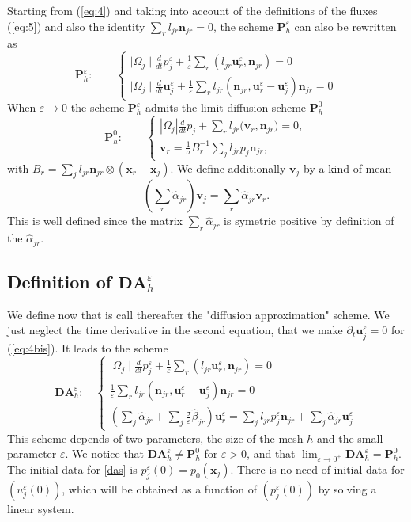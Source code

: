 \documentclass[a4paper,french,english,10pt]{article}
\newcommand\ljr{l_{jr}}
\newcommand\njr{\mathbf{n}_{jr}}
\newcommand\uu{\mathbf{u}}
\newcommand\vv{\mathbf{v}}
\newcommand\eps{\varepsilon}
\newcommand\alj{\widehat{\alpha}_{jr}}
\newcommand\bej{\widehat{\beta}_{jr}}
\newcommand\xj{\mathbf{x}_j}
\newcommand\xr{\mathbf{x}_r}
\newcommand\uj{\uu_j}
\newcommand\ur{\uu_r}
\begin{document}
Starting from (\ref{eq:4}) and taking into account of the definitions of
the fluxes (\ref{eq:5}) and also the identity $\sum_r l_{jr} \njr=0$,
the scheme $\mathbf P_h^\eps$ can also be rewritten as
\begin{equation}\label{eq:4bis}
\mathbf P_h^\eps:
\qquad
\left\{ 
\begin{array}{l}
\displaystyle \mid\Omega_{j}\mid\frac{d}{dt} p_{j}^{\eps}+\frac{1}{\varepsilon}
\sum_{r}(l_{jr}\ur^{\eps},\njr)=0\\
\displaystyle \mid
\Omega_{j}\mid\frac{d}{dt}\uj^{\eps}+\frac{1}{\varepsilon}
\sum_{r}l_{jr} (\njr,\uu_r^{\eps} -\uu_j^{\eps})\njr=0
\end{array}
\right.
\end{equation}
When $\eps \rightarrow 0$
the scheme $\mathbf P_h^\eps$ admits the limit diffusion scheme 
$\mathbf P_h^0$ 
\begin{equation}\label{diffglace}
\mathbf P_h^0:
\qquad\left\{ \begin{array}{l}
\displaystyle \left| \Omega_j 
\right| \frac{d}{dt} p_j+ 
\sum_{r} l_{jr}\bigg( 
\vv_r,\njr\bigg)=0,\\
\displaystyle \vv_r=\frac{1}{\sigma} B_r^{-1}
\sum_{j}l_{jr}p_j\njr,
\end{array}\right.
\end{equation}
with $B_r=\sum_{j}l_{jr}\njr\otimes(\xr-\xj)$.
We  define additionally $\vv_j$ by a kind of mean
$$
\left( \sum_r \alj \right) \vv_j=\sum_r \alj
\vv_r.
$$
This is well defined since the matrix
$\sum_r \alj$ is  symetric positive by definition of the $\alj$.

\subsection{Definition of $\mathbf{DA}_h^\eps$}


We define now that is  call thereafter the "diffusion approximation" 
scheme.
We just neglect the time derivative
in the second equation, that we make
 $\partial_t\uj^{\eps}=0$ for (\ref{eq:4bis}). It
leads to the scheme
\begin{equation}\label{das}
\mathbf{DA}_h^\eps:
\quad
\left\{ 
\begin{array}{l}
\displaystyle \mid\Omega_{j}\mid\frac{d}{dt} p_{j}^{\eps}+\frac{1}{\varepsilon}
\sum_{r}(l_{jr}\ur^{\eps},\njr)=0\\
\frac{1}{\varepsilon} \sum_{r}l_{jr} (\njr,\uu_r^{\eps} -\uu_j^{\eps})\njr=0\\
\displaystyle \left( \sum_{j}\alj+ 
\sum_{j}\frac{\sigma}{\varepsilon}\bej\right)\ur^{
\eps}= \sum_{j}\ljr
p_j^{\eps}\njr+\sum_j\alj\uj^{\eps}
\end{array}
\right.
\end{equation}
This  scheme depends of
two parameters, the size of the mesh $h$ and the small parameter 
$\eps$.
We notice that
$\mathbf{DA}_h^\eps\neq \mathbf P_h^0$ for $\eps> 0$, and that 
$\lim_{\eps\rightarrow 0^+} \mathbf{DA}_h^\eps = \mathbf P_h^0$.
The initial data for \eqref{das} is $p_j^{\eps}(0)=p_0(\mathbf{x}_j)$. There is no 
need of initial data for $(u_j^{\eps}(0))$, which will be obtained 
 as a function of $(p_j^{\eps}(0))$ by solving a linear system.
\end{document}
